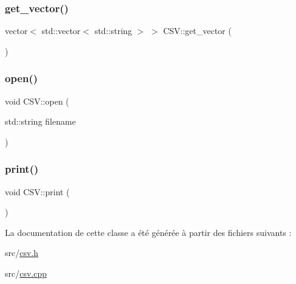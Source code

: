 \subsubsection{\texorpdfstring{get\+\_\+vector()}{get\_vector()}}
{\footnotesize\ttfamily vector$<$ std\+::vector$<$ std\+::string $>$ $>$ C\+S\+V\+::get\+\_\+vector (\begin{DoxyParamCaption}{ }\end{DoxyParamCaption})}

\mbox{\label{classCSV_a80fbeab0aad2b0695d0720cc863826b8}} 
\subsubsection{\texorpdfstring{open()}{open()}}
{\footnotesize\ttfamily void C\+S\+V\+::open (\begin{DoxyParamCaption}\item[{std\+::string}]{filename }\end{DoxyParamCaption})}

\mbox{\label{classCSV_aabdbae3a626d0bc5a0dc573c9161f0a9}} 
\subsubsection{\texorpdfstring{print()}{print()}}
{\footnotesize\ttfamily void C\+S\+V\+::print (\begin{DoxyParamCaption}{ }\end{DoxyParamCaption})}



La documentation de cette classe a été générée à partir des fichiers suivants \+:\begin{DoxyCompactItemize}
\item 
src/\hyperlink{csv_8h}{csv.\+h}\item 
src/\hyperlink{csv_8cpp}{csv.\+cpp}\end{DoxyCompactItemize}
